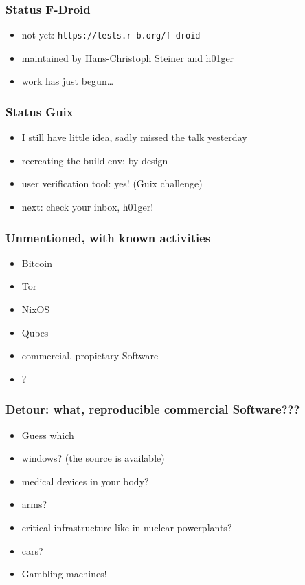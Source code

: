 \documentclass[14pt]{beamer}
\begin{document}
\begin{frame}
 \frametitle{Status F-Droid}
 \begin{itemize}
  \item not yet: \texttt{https://tests.r-b.org/f-droid}
  \item maintained by Hans-Christoph Steiner and h01ger
  \item work has just begun…
 \end{itemize}
\end{frame}

\begin{frame}
 \frametitle{Status Guix}
 \begin{itemize}
  \item I still have little idea, sadly missed the talk yesterday
  \item recreating the build env: by design
  \item user verification tool: yes! (Guix challenge)
  \item<2> next: check your inbox, h01ger!
 \end{itemize}
\end{frame}

\begin{frame}
 \frametitle{Unmentioned, with known activities}
 \begin{itemize}
\item Bitcoin
\item Tor
    \item NixOS
    \item Qubes
\item    commercial, propietary Software
\item ?
 \end{itemize}
\end{frame}

\begin{frame}
 \frametitle{Detour: what, reproducible commercial Software???}
 \begin{itemize}
\item Guess which
\item <2-3>   windows? (the source is available)
\item <2-3>   medical devices in your body?
\item <2-3>   arms?
\item <2-3>   critical infrastructure like in nuclear powerplants?
\item <2-3>   cars?
\item <3> Gambling machines!
 \end{itemize}
\end{frame}
\end{document}
